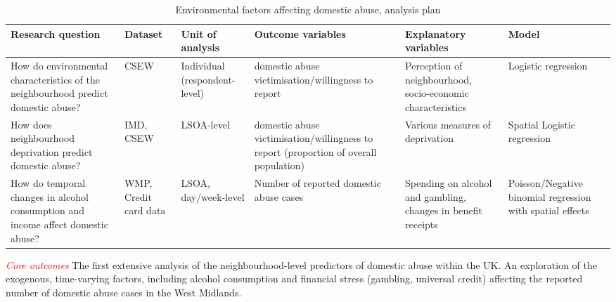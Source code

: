\documentclass[11pt, a4paper]{article}
\begin{document}
\begin{table}[!htbp]
\caption{Environmental factors affecting domestic abuse, analysis plan}
  \begin{threeparttable}[t]
  \centering
       \begin{tabular}{ L{2.8cm}  C{1.8cm}  C{1.8cm}  C{3.2cm}  C{2.8cm}  C{2cm} }
    \toprule
     \textbf{Research question} & \textbf{Dataset}    & \textbf{Unit of analysis} & \textbf{Outcome variables} & \textbf{Explanatory variables} & \textbf{Model} \\
    \midrule
    How do environmental characteristics of the neighbourhood predict domestic abuse? & CSEW & Individual (respondent-level) & domestic abuse victimisation/willingness to report & Perception of neighbourhood, socio-economic characteristics & Logistic regression \\
         \midrule
          How does neighbourhood deprivation predict domestic abuse? & IMD, CSEW & LSOA-level & domestic abuse victimisation/willingness to report (proportion of overall population) & Various measures of deprivation & Spatial Logistic regression \\
         \midrule
    How do temporal changes in alcohol consumption and income affect domestic abuse? & WMP, Credit card data & LSOA, day/week-level & Number of reported domestic abuse cases & Spending on alcohol and gambling, changes in benefit receipts & Poisson/Negative binomial regression with spatial effects \\

     \bottomrule
  \end{tabular}
    \end{threeparttable}%
  \label{tab:addlabel}%
\end{table}%

\textcolor{red}{\textit{Core outcomes}} The first extensive analysis of the neighbourhood-level predictors of domestic abuse within the UK. An exploration of the exogenous, time-varying factors, including alcohol consumption and financial stress (gambling, universal credit) affecting the reported number of domestic abuse cases in the West Midlands. 



%
%
%
%
%
%
%
%
%
\end{document}
